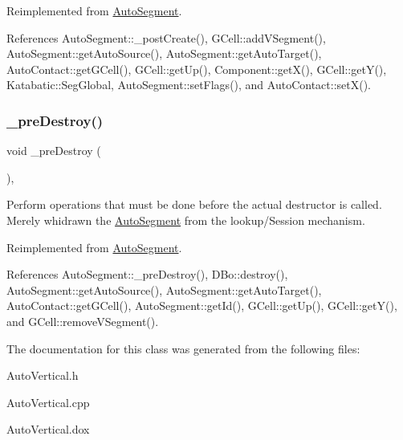 Reimplemented from \hyperlink{classKatabatic_1_1AutoSegment_a3715b38135ca24745f610bebd3407c10}{Auto\+Segment}.



References Auto\+Segment\+::\+\_\+post\+Create(), G\+Cell\+::add\+V\+Segment(), Auto\+Segment\+::get\+Auto\+Source(), Auto\+Segment\+::get\+Auto\+Target(), Auto\+Contact\+::get\+G\+Cell(), G\+Cell\+::get\+Up(), Component\+::get\+X(), G\+Cell\+::get\+Y(), Katabatic\+::\+Seg\+Global, Auto\+Segment\+::set\+Flags(), and Auto\+Contact\+::set\+X().

\mbox{\label{classKatabatic_1_1AutoVertical_a7c13d9795eafd477994961f8a0d962d0}} 
\subsubsection{\texorpdfstring{\+\_\+pre\+Destroy()}{\_preDestroy()}}
{\footnotesize\ttfamily void \+\_\+pre\+Destroy (\begin{DoxyParamCaption}{ }\end{DoxyParamCaption})\hspace{0.3cm}{\ttfamily [protected]}, {\ttfamily [virtual]}}

Perform operations that must be done before the actual destructor is called. Merely whidrawn the \hyperlink{classKatabatic_1_1AutoSegment}{Auto\+Segment} from the lookup/\+Session mechanism. 

Reimplemented from \hyperlink{classKatabatic_1_1AutoSegment_a7c13d9795eafd477994961f8a0d962d0}{Auto\+Segment}.



References Auto\+Segment\+::\+\_\+pre\+Destroy(), D\+Bo\+::destroy(), Auto\+Segment\+::get\+Auto\+Source(), Auto\+Segment\+::get\+Auto\+Target(), Auto\+Contact\+::get\+G\+Cell(), Auto\+Segment\+::get\+Id(), G\+Cell\+::get\+Up(), G\+Cell\+::get\+Y(), and G\+Cell\+::remove\+V\+Segment().



The documentation for this class was generated from the following files\+:\begin{DoxyCompactItemize}
\item 
Auto\+Vertical.\+h\item 
Auto\+Vertical.\+cpp\item 
Auto\+Vertical.\+dox\end{DoxyCompactItemize}
